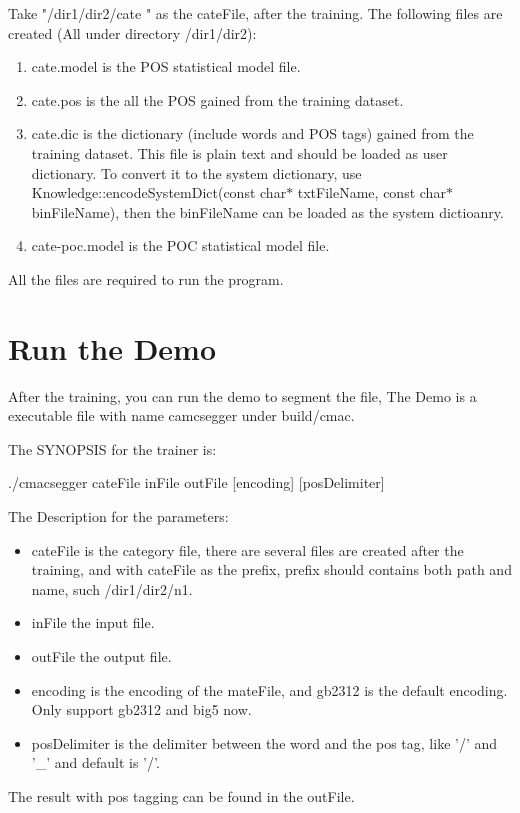 Take "/dir1/dir2/cate " as the cateFile, after the training. The following files are created (All under directory /dir1/dir2): \begin{enumerate}
\item cate.model is the POS statistical model file. \item cate.pos is the all the POS gained from the training dataset. \item cate.dic is the dictionary (include words and POS tags) gained from the training dataset. This file is plain text and should be loaded as user dictionary. To convert it to the system dictionary, use Knowledge::encodeSystemDict(const char$\ast$ txtFileName, const char$\ast$ binFileName), then the binFileName can be loaded as the system dictioanry. \item cate-poc.model is the POC statistical model file. \end{enumerate}


All the files are required to run the program.\par
\section{Run the Demo}\label{index_rundemo}
After the training, you can run the demo to segment the file, The Demo is a executable file with name camcsegger under build/cmac.

The SYNOPSIS for the trainer is: \par
 ./cmacsegger cateFile inFile outFile [encoding] [posDelimiter] \par


\par
The Description for the parameters: \begin{itemize}
\item cateFile is the category file, there are several files are created after the training, and with cateFile as the prefix, prefix should contains both path and name, such /dir1/dir2/n1. \item inFile the input file. \item outFile the output file. \item encoding is the encoding of the mateFile, and gb2312 is the default encoding. Only support gb2312 and big5 now. \item posDelimiter is the delimiter between the word and the pos tag, like '/' and '\_\-' and default is '/'. \end{itemize}


The result with pos tagging can be found in the outFile. 